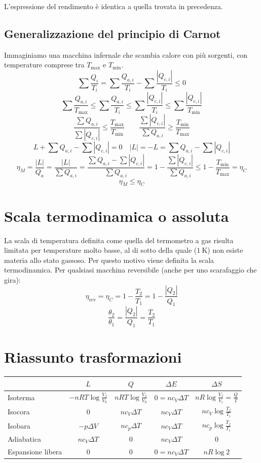 L'espressione del rendimento è identica a quella trovata in precedenza.
\subsection{Generalizzazione del principio di Carnot}
Immaginiamo una macchina infernale che scambia calore con più sorgenti, con temperature comprese tra $T_{\max}$ e $T_{\min}$.
\[\sum\frac{Q_i}{T_i}=\sum\frac{Q_{a,i}}{T_i}-\sum\frac{|Q_{c,i}|}{T_i}\leq 0\]
\[\sum\frac{Q_{a,i}}{T_{\max}} \leq \sum\frac{Q_{a,i}}{T_i}\leq\sum\frac{|Q_{c,i}|}{T_i}\leq\sum\frac{|Q_{c,i}|}{T_{\min}}\]
\[\frac{\sum Q_{a,i}}{\sum|Q_{c,i}|}\leq\frac{T_{\max}}{T_{\min}}\qquad \frac{\sum |Q_{c,i}|}{\sum Q_{a,i}}\geq\frac{T_{\min}}{T_{\max}}\]
\[L+\sum Q_{a,i}-\sum|Q_{c,i}|=0\quad |L|=-L=\sum Q_{a,i}-\sum|Q_{c,i}|\]
\[\eta_M=\frac{|L|}{Q_a}=\frac{|L|}{\sum Q_{a,i}}=\frac{\sum Q_{a,i}-\sum |Q_{c,i}|}{\sum Q_{a,i}}=1-\frac{\sum|Q_{c,i}|}{\sum Q_{a,i}}\leq 1-\frac{T_{\min}}{T_{\max}}=\eta_C\]
\[\eta_M\leq\eta_C\]


\section{Scala termodinamica o assoluta}
La scala di temperatura definita come quella del termometro a gas risulta limitata per temperature molto basse, al di sotto della quale ($\SI{1}{\kelvin}$) non esiste materia allo stato gassoso. Per questo motivo viene definita la scala termodinamica. Per qualsiasi macchina reversibile (anche per uno scarafaggio che gira):
\[\eta_\text{rev}=\eta_C=1-\frac{T_2}{T_1}=1-\frac{|Q_2|}{Q_1}\]
\[\frac{\theta_2}{\theta_1}=\frac{|Q_2|}{Q_1}=\frac{T_2}{T_1}\]



\section{Riassunto trasformazioni}
\begin{center}
\begin{tabular}{p{2cm}|cccc}
&$L$&$Q$&$\Delta E$&$\Delta S$\\
\hline
Isoterma&$-nRT\log\frac{V_f}{V_0}$&$nRT\log\frac{V_f}{V_0}$&$0=nc_V\Delta T$&$nR\log\frac{V_f}{V_i}=\frac{Q}{T}$\\
Isocora&$0$&$nc_V\Delta T$&$nc_V\Delta T$&$nc_V\log\frac{T_f}{T_i}$\\
Isobara&$-p\Delta V$&$nc_p\Delta T$&$nc_V\Delta T$&$nc_p\log\frac{T_f}{T_i}$\\
Adiabatica&$nc_V\Delta T$&$0$&$nc_V\Delta T$&$0$\\
Espansione libera&$0$&$0$&$0=nc_V\Delta T$&$nR\log 2$\\
\end{tabular}
\end{center}



